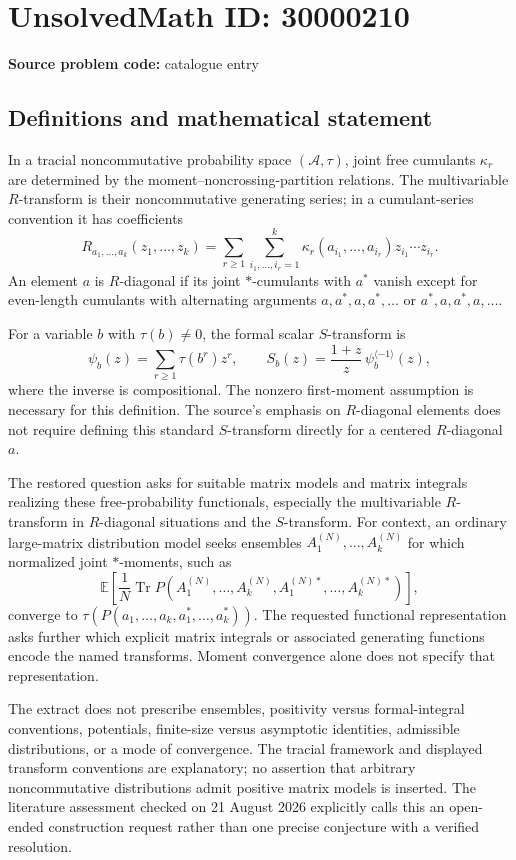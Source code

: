 \documentclass[11pt]{article}
\begin{document}
\section*{UnsolvedMath ID: 30000210}
\textbf{Source problem code:} catalogue entry
\subsection{Definitions and mathematical statement}
In a tracial noncommutative probability space $(\mathcal A,\tau)$, joint free cumulants $\kappa_r$ are determined by the moment--noncrossing-partition relations. The multivariable $R$-transform is their noncommutative generating series; in a cumulant-series convention it has coefficients
\[
 R_{a_1,\ldots,a_k}(z_1,\ldots,z_k)
 =\sum_{r\ge1}\sum_{i_1,\ldots,i_r=1}^k
 \kappa_r(a_{i_1},\ldots,a_{i_r})z_{i_1}\cdots z_{i_r}.
\]
An element $a$ is $R$-diagonal if its joint $*$-cumulants with $a^*$ vanish except for even-length cumulants with alternating arguments $a,a^*,a,a^*,\ldots$ or $a^*,a,a^*,a,\ldots$.

For a variable $b$ with $\tau(b)\ne0$, the formal scalar $S$-transform is
\[
 \psi_b(z)=\sum_{r\ge1}\tau(b^r)z^r,\qquad
 S_b(z)=\frac{1+z}{z}\,\psi_b^{\langle-1\rangle}(z),
\]
where the inverse is compositional. The nonzero first-moment assumption is necessary for this definition. The source's emphasis on $R$-diagonal elements does not require defining this standard $S$-transform directly for a centered $R$-diagonal $a$.

The restored question asks for suitable matrix models and matrix integrals realizing these free-probability functionals, especially the multivariable $R$-transform in $R$-diagonal situations and the $S$-transform. For context, an ordinary large-matrix distribution model seeks ensembles $A_1^{(N)},\ldots,A_k^{(N)}$ for which normalized joint $*$-moments, such as
\[
 \mathbb E\left[\frac1N\operatorname{Tr}
  P(A_1^{(N)},\ldots,A_k^{(N)},A_1^{(N)*},\ldots,A_k^{(N)*})\right],
\]
converge to $\tau(P(a_1,\ldots,a_k,a_1^*,\ldots,a_k^*))$. The requested functional representation asks further which explicit matrix integrals or associated generating functions encode the named transforms. Moment convergence alone does not specify that representation.

The extract does not prescribe ensembles, positivity versus formal-integral conventions, potentials, finite-size versus asymptotic identities, admissible distributions, or a mode of convergence. The tracial framework and displayed transform conventions are explanatory; no assertion that arbitrary noncommutative distributions admit positive matrix models is inserted. The literature assessment checked on 21 August 2026 explicitly calls this an open-ended construction request rather than one precise conjecture with a verified resolution.
\end{document}

